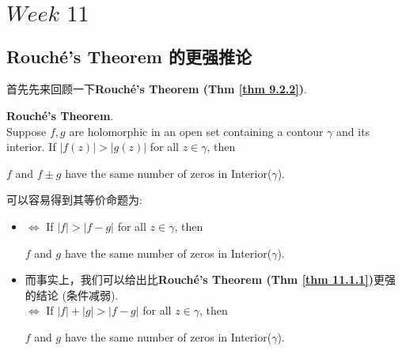 \ifx\allfiles\undefined


	\else
	\fi

\setcounter{chapter}{10}
\chapter{$Week \,\, 11$}
\section{Rouch\'{e}'s Theorem 的更强推论}
	首先先来回顾一下\textbf{Rouch\'{e}'s Theorem (Thm \ref{thm 9.2.2})}.
	\begin{thm}\label{thm 11.1.1}
		\textbf{Rouch\'{e}'s Theorem}. \\
		Suppose $f , g$ are holomorphic in an open set containing a contour $\gamma$ and its interior. If $\left| f(z) \right| > \left| g(z) \right|$ for all $z \in \gamma$, then
		\begin{center}
			$f$ and $f \pm g$ have the same number of zeros in Interior($\gamma$).
		\end{center}
	
		\vspace{2em}
		\begin{rmk}
			可以容易得到其等价命题为: 
			\begin{itemize}
				\item $\Leftrightarrow$ If $\left| f \right| > \left| f - g \right|$ for all $z \in \gamma$, then
				\begin{center}
					$f$ and $g$ have the same number of zeros in Interior($\gamma$).
				\end{center}
				
				\vspace*{2em}
				
				\item 而事实上，我们可以给出比\textbf{Rouch\'{e}'s Theorem (Thm \ref{thm 11.1.1})}更强的结论 (条件减弱). \\
				$\Leftrightarrow$ If $\left| f \right| + \left| g \right| > \left| f - g \right|$ for all $z \in \gamma$, then
				\begin{center}
					$f$ and $g$ have the same number of zeros in Interior($\gamma$).
				\end{center}
			\end{itemize}
		\end{rmk}
	\end{thm}

